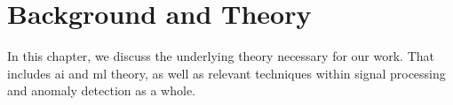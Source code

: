\chapter{Background and Theory}
\label{chap:back}

In this chapter, we discuss the underlying theory necessary for our work. That includes \acrshort{ai} and \acrshort{ml} theory, as well as relevant techniques within signal processing and anomaly detection as a whole. \\








